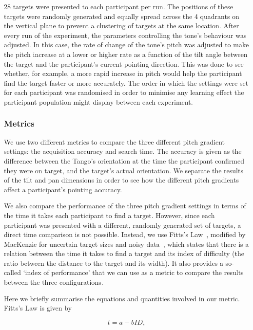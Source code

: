 \documentclass[sigconf, review=true, screen=true, anonymous=true]{acmart}
\begin{document}
28 targets were presented to each participant per run.
The positions of these targets were randomly generated and equally spread across the 4 quadrants on the vertical plane to prevent a clustering of targets at the same location.
After every run of the experiment, the parameters controlling the tone's behaviour was adjusted.
In this case, the rate of change of the tone's pitch was adjusted to make the pitch increase at a lower or higher rate as a function of the tilt angle between the target and the participant's current pointing direction.
This was done to see whether, for example, a more rapid increase in pitch would help the participant find the target faster or more accurately.
The order in which the settings were set for each participant was randomised in order to minimise any learning effect the participant population might display between each experiment. 

\subsubsection{Metrics}

We use two different metrics to compare the three different pitch gradient settings: the acquisition accuracy and search time.
The accuracy is given as the difference between the Tango's orientation at the time the participant confirmed they were on target, and the target's actual orientation.
We separate the results of the tilt and pan dimensions in order to see how the different pitch gradients affect a participant's pointing accuracy. 

We also compare the performance of the three pitch gradient settings in terms of the time it takes each participant to find a target.
However, since each participant was presented with a different, randomly generated set of targets, a direct time comparison is not possible.
Instead, we use Fitts's Law~\cite{fitts1954information}, modified by MacKenzie for uncertain target sizes and noisy data~\cite{mackenzie1992fitts}, which states that there is a relation between the time it takes to find a target and its index of difficulty (the ratio between the distance to the target and its width).
It also provides a so-called `index of performance' that we can use as a metric to compare the results between the three configurations. 

Here we briefly summarise the equations and quantities involved in our metric.
Fitts's Law is given by  

\begin{equation}
  \label{eq:fitts-base}
  t = a + bID,
\end{equation}
\end{document}
